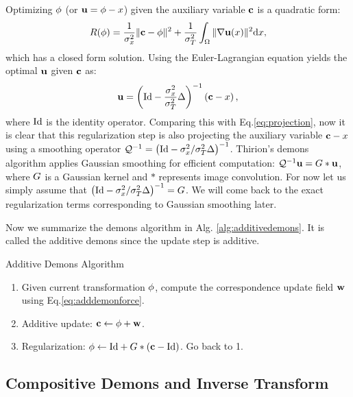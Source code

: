 \documentclass[letterpaper,12pt]{article}
\begin{document}
Optimizing $\phi$ (or $\mathbf{u} = \phi - x$) given the auxiliary variable $\mathbf{c}$ is a quadratic form: 
\begin{align}
R(\phi) = \frac{1}{\sigma_x^2} \|\mathbf{c} - \phi\|^2+\frac{1}{\sigma_T^2} \int_\Omega \| \nabla\mathbf{u}(x)\|^2 \text{d} x,
\end{align}
which has a closed form solution.  Using the Euler-Lagrangian equation yields the optimal $\mathbf{u}$ given $\mathbf{c}$ as:
\begin{align}
\mathbf{u} = \left( \text{Id} - \frac{\sigma_x^2}{\sigma_T^2} \Delta \right)^{-1} \left( \mathbf{c} - x \right),
\end{align}
where $\text{Id}$ is the identity operator. Comparing this with
Eq.\ref{eq:projection}, now it is clear that this regularization step
is also projecting the auxiliary variable $\mathbf{c}-x$ using a smoothing
operator  $\mathcal{Q}^{-1} = \left( \text{Id} - {\sigma_x^2}/{\sigma_T^2} \Delta \right)^{-1}$. 
Thirion's demons algorithm applies Gaussian smoothing for efficient
computation: $\mathcal{Q}^{-1} \mathbf{u} = {G} \ast \mathbf{u}$, where ${G}$ is a Gaussian
kernel and $\ast$ represents image convolution. For now let us simply
assume that $\left( \text{Id} - {\sigma_x^2}/{\sigma_T^2} \Delta \right)^{-1} =
{G}$.  We will come back to the exact regularization terms corresponding to Gaussian smoothing later.


Now we summarize the demons algorithm in Alg. \ref{alg:additivedemons}. It is called the additive demons since the update step is additive.
\begin{algorithm}
\caption{Additive Demons Algorithm}
\label{alg:additivedemons}
\begin{enumerate}
\item{Given current transformation $\phi$, compute the correspondence update field $\mathbf{w}$ using Eq.\ref{eq:adddemonforce}. 
}
\item{Additive update: $\mathbf{c} \leftarrow \phi + \mathbf{w}$.
}
\item{Regularization: $\phi \leftarrow \text{Id} + {G} \ast (\mathbf{c} - \text{Id})$. Go back to 1.
}
\end{enumerate}
\end{algorithm}

\subsection{Compositive Demons and Inverse Transform}
\label{sec:compositivedemons}
\end{document}
